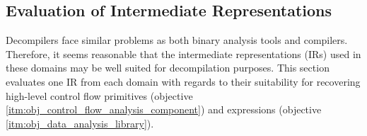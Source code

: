 
\subsection{Evaluation of Intermediate Representations}

Decompilers face similar problems as both binary analysis tools and compilers. Therefore, it seems reasonable that the intermediate representations (IRs) used in these domains may be well suited for decompilation purposes. This section evaluates one IR from each domain with regards to their suitability for recovering high-level control flow primitives (objective \ref{itm:obj_control_flow_analysis_component}) and expressions (objective \ref{itm:obj_data_analysis_library}).




